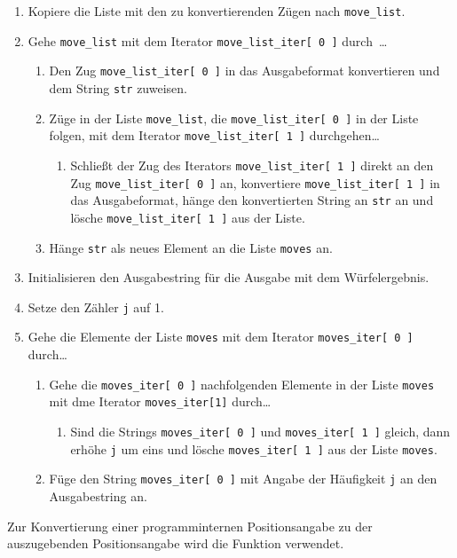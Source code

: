 \begin{enumerate}
  \item Kopiere die Liste mit den zu konvertierenden Zügen nach \lstinline$move_list$.
  \item Gehe \lstinline$move_list$ mit dem Iterator \lstinline$move_list_iter[ 0 ]$ durch~\dots
    \begin{enumerate}[\theenumi.1.]
      \item Den Zug \lstinline$move_list_iter[ 0 ]$ in das Ausgabeformat konvertieren und dem String \lstinline$str$ zuweisen.
      \item Züge in der Liste \lstinline$move_list$, die \lstinline$move_list_iter[ 0 ]$ in der Liste folgen, mit dem Iterator \lstinline$move_list_iter[ 1 ]$ durchgehen\dots
        \begin{enumerate}
          \item Schließt der Zug des Iterators \lstinline$move_list_iter[ 1 ]$ direkt an den Zug \lstinline$move_list_iter[ 0 ]$ an, konvertiere \lstinline$move_list_iter[ 1 ]$ in das Ausgabeformat, hänge den konvertierten String an \lstinline$str$ an und lösche \lstinline$move_list_iter[ 1 ]$ aus der Liste.
        \end{enumerate}
      \item Hänge \lstinline$str$ als neues Element an die Liste \lstinline$moves$ an.
    \end{enumerate}
    \item Initialisieren den Ausgabestring für die Ausgabe mit dem Würfelergebnis.
    \item Setze den Zähler \lstinline$j$ auf 1.
    \item Gehe die Elemente der Liste \lstinline$moves$ mit dem Iterator \lstinline$moves_iter[ 0 ]$ durch\dots
      \begin{enumerate}
        \item Gehe die \lstinline$moves_iter[ 0 ]$ nachfolgenden Elemente in der Liste \lstinline$moves$ mit dme Iterator \lstinline$moves_iter[1]$ durch\dots
          \begin{enumerate}
            \item Sind die Strings \lstinline$moves_iter[ 0 ]$ und \lstinline$moves_iter[ 1 ]$ gleich, dann erhöhe \lstinline$j$ um eins und lösche \lstinline$moves_iter[ 1 ]$ aus der Liste \lstinline$moves$.
          \end{enumerate}
        \item Füge den String \lstinline$moves_iter[ 0 ]$ mit Angabe der Häufigkeit \lstinline$j$ an den Ausgabestring an.
      \end{enumerate}
\end{enumerate}
Zur Konvertierung einer programminternen Positionsangabe zu der auszugebenden Positionsangabe wird die Funktion  verwendet. 
